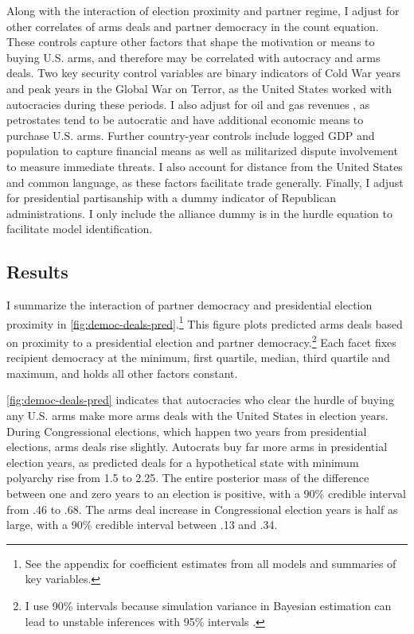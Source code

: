 \documentclass[12pt]{article}
\begin{document}
Along with the interaction of election proximity and partner regime, I adjust for other correlates of arms deals and partner democracy in the count equation. 
These controls capture other factors that shape the motivation or means to buying U.S. arms, and therefore may be correlated with autocracy and arms deals. 
Two key security control variables are binary indicators of Cold War years and peak years in the Global War on Terror, as the United States worked with autocracies during these periods. 
I also adjust for oil and gas revenues \citep{RossMahdavi2015}, as petrostates tend to be autocratic and have additional economic means to purchase U.S. arms.
Further country-year controls include logged GDP and population to capture financial means as well as militarized dispute involvement to measure immediate threats.
I also account for distance from the United States and common language, as these factors facilitate trade generally. 
Finally, I adjust for presidential partisanship with a dummy indicator of Republican administrations.  
I only include the alliance dummy is in the hurdle equation to facilitate model identification.


\subsection{Results}


I summarize the interaction of partner democracy and presidential election proximity in \autoref{fig:democ-deals-pred}.\footnote{See the appendix for coefficient estimates from all models and summaries of key variables.}
This figure plots predicted arms deals based on proximity to a presidential election and partner democracy.\footnote{I use 90\% intervals because simulation variance in Bayesian estimation can lead to unstable inferences with 95\% intervals \citep{McElreath2016}.}
Each facet fixes recipient democracy at the minimum, first quartile, median, third quartile and maximum, and holds all other factors constant.


\autoref{fig:democ-deals-pred} indicates that autocracies who clear the hurdle of buying any U.S. arms make more arms deals with the United States in election years.
During Congressional elections, which happen two years from presidential elections, arms deals rise slightly. 
Autocrats buy far more arms in presidential election years, as predicted deals for a hypothetical state with minimum polyarchy rise from 1.5 to 2.25. 
The entire posterior mass of the difference between one and zero years to an election is positive, with a 90\% credible interval from .46 to .68.
The arms deal increase in Congressional election years is half as large, with a 90\% credible interval between .13 and .34. 
\end{document}
